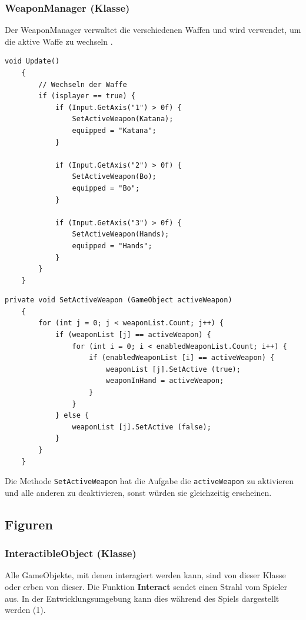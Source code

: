 \subsubsection{WeaponManager (Klasse)}
Der WeaponManager verwaltet die verschiedenen Waffen und wird verwendet, um die aktive Waffe zu wechseln .

\begin{lstlisting}[caption={Wechsel der Waffen je nach Taste}]
	void Update()
	{
		// Wechseln der Waffe
		if (isplayer == true) {
			if (Input.GetAxis("1") > 0f) {
				SetActiveWeapon(Katana);
				equipped = "Katana";
			}

			if (Input.GetAxis("2") > 0f) {
				SetActiveWeapon(Bo);
				equipped = "Bo";
			}

			if (Input.GetAxis("3") > 0f) {
				SetActiveWeapon(Hands);
				equipped = "Hands";
			}
		}
	}
\end{lstlisting}

\begin{lstlisting}[caption={Aktivieren einer Waffe}]
	private void SetActiveWeapon (GameObject activeWeapon)
	{
		for (int j = 0; j < weaponList.Count; j++) {
			if (weaponList [j] == activeWeapon) {
				for (int i = 0; i < enabledWeaponList.Count; i++) {
					if (enabledWeaponList [i] == activeWeapon) {
						weaponList [j].SetActive (true);
						weaponInHand = activeWeapon;
					}
				}
			} else {
				weaponList [j].SetActive (false);
			}
		}
	}
\end{lstlisting}

Die Methode \lstinline{SetActiveWeapon} hat die Aufgabe die \lstinline{activeWeapon} zu aktivieren und alle anderen zu deaktivieren, sonst würden sie gleichzeitig erscheinen.

\subsection{Figuren}

\subsubsection{InteractibleObject (Klasse)}
\label{subsubsec:interactibleobject}
Alle GameObjekte, mit denen interagiert werden kann, sind von dieser Klasse oder erben von dieser.
Die Funktion \textbf{Interact} sendet einen Strahl vom Spieler aus. In der Entwicklungsumgebung kann dies während des Spiels dargestellt werden (1).

